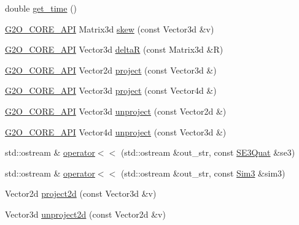 \begin{DoxyCompactItemize}
\item 
double \mbox{\hyperlink{namespaceg2o_a6baa8fdfd973b5b970df14f14fd5d844}{get\+\_\+time}} ()
\item 
\mbox{\hyperlink{g2o__core__api_8h_a7a8d7648d6f1e26632566f335751d064}{G2\+O\+\_\+\+C\+O\+R\+E\+\_\+\+A\+PI}} Matrix3d \mbox{\hyperlink{namespaceg2o_adb3143a37b9bc002f4f7b6423061ef81}{skew}} (const Vector3d \&v)
\item 
\mbox{\hyperlink{g2o__core__api_8h_a7a8d7648d6f1e26632566f335751d064}{G2\+O\+\_\+\+C\+O\+R\+E\+\_\+\+A\+PI}} Vector3d \mbox{\hyperlink{namespaceg2o_a2e39915fb420fd7dc2d3802435e4a6a9}{deltaR}} (const Matrix3d \&R)
\item 
\mbox{\hyperlink{g2o__core__api_8h_a7a8d7648d6f1e26632566f335751d064}{G2\+O\+\_\+\+C\+O\+R\+E\+\_\+\+A\+PI}} Vector2d \mbox{\hyperlink{namespaceg2o_a45b89a0471d862c09167e7ce718df000}{project}} (const Vector3d \&)
\item 
\mbox{\hyperlink{g2o__core__api_8h_a7a8d7648d6f1e26632566f335751d064}{G2\+O\+\_\+\+C\+O\+R\+E\+\_\+\+A\+PI}} Vector3d \mbox{\hyperlink{namespaceg2o_a3d337768fe9db907df691e3624ca4e1e}{project}} (const Vector4d \&)
\item 
\mbox{\hyperlink{g2o__core__api_8h_a7a8d7648d6f1e26632566f335751d064}{G2\+O\+\_\+\+C\+O\+R\+E\+\_\+\+A\+PI}} Vector3d \mbox{\hyperlink{namespaceg2o_ab8746174c3f8c25af4188fc24b2dc3d4}{unproject}} (const Vector2d \&)
\item 
\mbox{\hyperlink{g2o__core__api_8h_a7a8d7648d6f1e26632566f335751d064}{G2\+O\+\_\+\+C\+O\+R\+E\+\_\+\+A\+PI}} Vector4d \mbox{\hyperlink{namespaceg2o_a46785a7417bd703d67107c2b5f649007}{unproject}} (const Vector3d \&)
\item 
std\+::ostream \& \mbox{\hyperlink{namespaceg2o_a613d60098b4ebe03626c13f9432b7834}{operator$<$$<$}} (std\+::ostream \&out\+\_\+str, const \mbox{\hyperlink{classg2o_1_1_s_e3_quat}{S\+E3\+Quat}} \&se3)
\item 
std\+::ostream \& \mbox{\hyperlink{namespaceg2o_a8ab958f2ec4a80e849def091d38f1131}{operator$<$$<$}} (std\+::ostream \&out\+\_\+str, const \mbox{\hyperlink{structg2o_1_1_sim3}{Sim3}} \&sim3)
\item 
Vector2d \mbox{\hyperlink{namespaceg2o_acc3b6db544c564fb29c4ea60c1fcb775}{project2d}} (const Vector3d \&v)
\item 
Vector3d \mbox{\hyperlink{namespaceg2o_a6edbda6681de50df71048c5b72778998}{unproject2d}} (const Vector2d \&v)
\end{DoxyCompactItemize}
